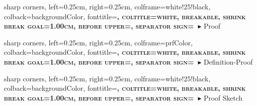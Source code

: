
%
{%
sharp corners,
left=0.25cm,
right=0.25cm,
colframe=white!25!black,
colback=backgroundColor,
fonttitle=\bfseries\scshape\SmallCapsFont,
coltitle=white,
breakable,
shrink break goal=1.00cm,
before upper={},
separator sign={\ $\blacktriangleright$}%
}{Proof}

\newenvironment{Proof}[1]{%
    \begin{tcbproof}{{\fontsize{10}{12}\selectfont\hyperwhite\textsc{\bfseries#1}}}{}\hyperred%
}%
{%
    \hfill%
    $\smash{\texttt{[image: ../../pictures/trans-flag/trans-flag.pdf]}}$%
    \end{tcbproof}\hyperred%
}%

%
{%
sharp corners,
left=0.25cm,
right=0.25cm,
colframe=prfColor,
colback=backgroundColor,
fonttitle=\bfseries\scshape\SmallCapsFont,
coltitle=white,
breakable,
shrink break goal=1.00cm,
before upper={},
separator sign={\ $\blacktriangleright$}%
}{Definition-Proof}

\newenvironment{definitionProof}[1]{%
    \begin{tcbdefinitionproof}{{\fontsize{10}{12}\selectfont\hyperwhite\textsc{\bfseries#1}}}{}\hyperred%
}
{
    \hfill%
    $\smash{\texttt{[image: ../../pictures/trans-flag/trans-flag.pdf]}}$%
    \end{tcbdefinitionproof}\hyperred%
}


%
{%
sharp corners,
left=0.25cm,
right=0.25cm,
colframe=white!25!black,
colback=backgroundColor,
fonttitle=\bfseries\scshape\SmallCapsFont,
coltitle=white,
breakable,
shrink break goal=1.00cm,
before upper={},
separator sign={\ $\blacktriangleright$}%
}{Proof Sketch}

